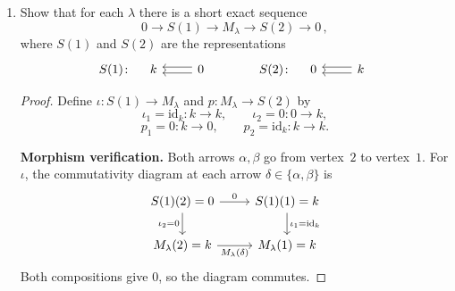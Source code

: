 \documentclass[11pt, a4paper]{article}
\begin{document}
\begin{enumerate}[leftmargin=*, label=\textbf{\arabic*.}]
\begin{enumerate}[label=(\alph*)]
\begin{proof}
    \textbf{Case 1:} $\lambda,\mu\in k$. The conditions become
    \[
    a\lambda = \mu b,\qquad a = b.
    \]
    Substituting $b=a$ into the first equation:
    \[
    a\lambda = \mu a \quad\Longrightarrow\quad a(\lambda-\mu) = 0.
    \]
    Since $\lambda\neq\mu$, we have $\lambda-\mu\neq 0$, so $a=0$. Then $b=a=0$.

    \textbf{Case 2:} $\lambda\in k$, $\mu=\infty$. Then $M_\lambda(\beta)=1$, $M_\infty(\beta)=0$. The condition at $\beta$ gives
    \[
    a\cdot 1 = 0\cdot b = 0,
    \]
    so $a=0$. The condition at $\alpha$ then gives
    \[
    0\cdot\lambda = 1\cdot b \quad\Longrightarrow\quad b = 0.
    \]

    \textbf{Case 3:} $\lambda=\infty$, $\mu\in k$. Then $M_\infty(\beta)=0$, $M_\mu(\beta)=1$. The condition at $\beta$ gives
    \[
    a\cdot 0 = 1\cdot b \quad\Longrightarrow\quad b = 0.
    \]
    The condition at $\alpha$ gives
    \[
    a\cdot 1 = \mu\cdot 0 = 0 \quad\Longrightarrow\quad a = 0.
    \]

    In every case, $f_1=f_2=0$, so $f=0$. Therefore $\operatorname{Hom}(M_\lambda,M_\mu) = 0$.
    \end{proof}
    \item Show that for each $\lambda$ there is a short exact sequence
    \[
        0 \longrightarrow S(1) \longrightarrow M_\lambda \longrightarrow S(2) \longrightarrow 0\,,
    \]
    where $S(1)$ and $S(2)$ are the representations
    \[
        S(1)\colon\quad
        \begin{tikzcd}
        k & 0 \arrow[l, shift right] \arrow[l, shift left]
        \end{tikzcd}
        \qquad\qquad
        S(2)\colon\quad
        \begin{tikzcd}
        0 & k \arrow[l, shift right] \arrow[l, shift left]
        \end{tikzcd}
    \]
    \begin{proof}
    Define $\iota\colon S(1)\to M_\lambda$ and $p\colon M_\lambda\to S(2)$ by
    \[
    \iota_1 = \mathrm{id}_k\colon k\to k,\qquad \iota_2 = 0\colon 0\to k,
    \]
    \[
    p_1 = 0\colon k\to 0,\qquad p_2 = \mathrm{id}_k\colon k\to k.
    \]
    
    \medskip\noindent\textbf{Morphism verification.}
    Both arrows $\alpha,\beta$ go from vertex~$2$ to vertex~$1$. For $\iota$, the commutativity diagram at each arrow $\delta\in\{\alpha,\beta\}$ is
    \[
    \begin{tikzcd}
    S(1)(2) = 0 \arrow[r, "0"] \arrow[d, "\iota_2=0"'] & S(1)(1) = k \arrow[d, "\iota_1=\mathrm{id}_k"] \\
    M_\lambda(2) = k \arrow[r, "M_\lambda(\delta)"'] & M_\lambda(1) = k
    \end{tikzcd}
    \]
    Both compositions give $0$, so the diagram commutes.
    

\end{proof}
\end{enumerate}
\end{enumerate}
\end{document}
